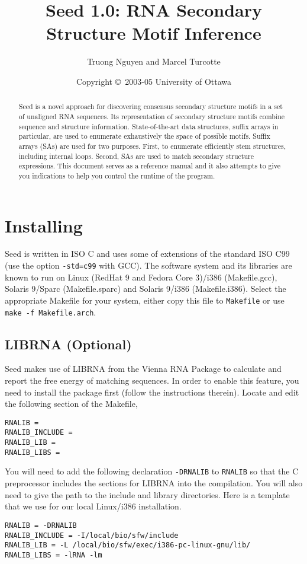 \documentclass{article}
\title{Seed 1.0: RNA Secondary Structure Motif Inference}
\author{Truong Nguyen and Marcel Turcotte}
\date{Copyright \copyright\ 2003-05 University of Ottawa}
\begin{document}
\maketitle

\begin{abstract}

Seed is a novel approach for discovering consensus secondary structure
motifs in a set of unaligned RNA sequences\cite{Nguyen2005}. Its representation of
secondary structure motifs combine sequence and structure
information. State-of-the-art data structures, suffix arrays in
particular, are used to enumerate exhaustively the space of possible
motifs. Suffix arrays (SAs) are used for two purposes. First, to
enumerate efficiently stem structures, including internal
loops. Second, SAs are used to match secondary structure
expressions. This document serves as a reference manual and it also
attempts to give you indications to help you control the runtime of
the program.

\end{abstract}

\section{Installing}

Seed is written in ISO C and uses some of extensions of the standard
ISO C99 (use the option \texttt{-std=c99} with GCC).  The software
system and its libraries are known to run on Linux (RedHat 9 and
Fedora Core 3)/i386 (Makefile.gcc), Solaris 9/Sparc (Makefile.sparc)
and Solaris 9/i386 (Makefile.i386). Select the appropriate Makefile
for your system, either copy this file to \texttt{Makefile} or use
\texttt{make -f Makefile.arch}.

\subsection{LIBRNA (Optional)}

Seed makes use of LIBRNA from the Vienna RNA Package to calculate and
report the free energy of matching sequences.  In order to enable this
feature, you need to install the package first (follow the
instructions therein).  Locate and edit the following section of the Makefile,
\begin{verbatim}
RNALIB =
RNALIB_INCLUDE =
RNALIB_LIB =
RNALIB_LIBS =
\end{verbatim}
You will need to add the following declaration \texttt{-DRNALIB} to
\texttt{RNALIB} so that the C preprocessor includes the sections for
LIBRNA into the compilation.  You will also need to give the path to
the include and library directories.  Here is a template that we use
for our local Linux/i386 installation.
\begin{verbatim}
RNALIB = -DRNALIB
RNALIB_INCLUDE = -I/local/bio/sfw/include
RNALIB_LIB = -L /local/bio/sfw/exec/i386-pc-linux-gnu/lib/
RNALIB_LIBS = -lRNA -lm
\end{verbatim}
\end{document}
